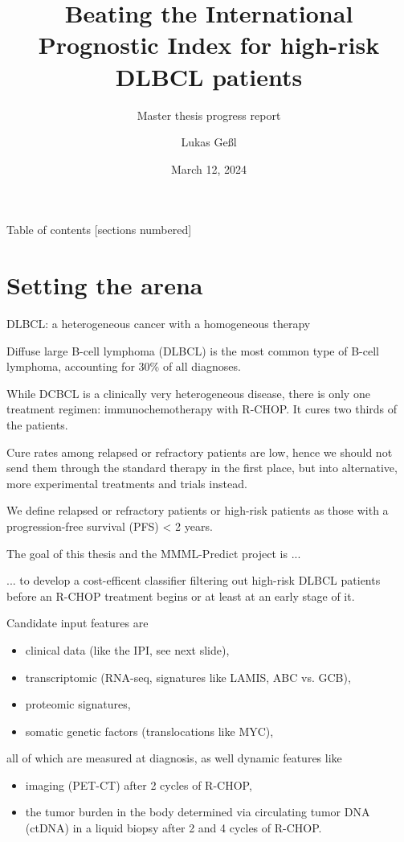 \documentclass[10pt, aspectratio=169]{beamer}
\title{Beating the International Prognostic Index for high-risk DLBCL patients}
\subtitle{Master thesis progress report}
\date{March 12, 2024}
\author{Lukas Geßl}
\institute{Chair of Statistical Bioinformatics, Regensburg University}
\begin{document}
\maketitle

\begin{frame}{Table of contents}
  [sections numbered]
  \tableofcontents[hideallsubsections]
\end{frame}

\section{Setting the arena}

\begin{frame}{DLBCL: a heterogeneous cancer with a homogeneous therapy}

  Diffuse large B-cell lymphoma (DLBCL) is the most common type of B-cell lymphoma, 
  accounting for 30\% of all diagnoses.

  While DCBCL is a clinically very heterogeneous disease, there is only one treatment 
  regimen: immunochemotherapy with R-CHOP. It cures two thirds of the patients.

  Cure rates among relapsed or refractory patients are low, hence we should not send 
  them through the standard therapy in the first place, but into alternative, more 
  experimental treatments and trials instead. 
  
  We define relapsed or refractory patients or \alert{high-risk} patients as those with a 
  \alert{progression-free survival (PFS) < 2 years}.

\end{frame}

\begin{frame}{The goal of this thesis and the MMML-Predict project is ...}

  ... to develop a \alert{cost-efficent classifier filtering out high-risk DLBCL patients} before an R-CHOP 
  treatment begins or at least at an early stage of it. 

  Candidate input features are 

  \begin{itemize}
    \item clinical data (like the IPI, see next slide),
    \item transcriptomic (RNA-seq, signatures like LAMIS, ABC vs. GCB),
    \item proteomic signatures,
    \item somatic genetic factors (translocations like MYC),
  \end{itemize}

  all of which are measured \alert{at diagnosis}, as well \alert{dynamic} features like 

  \begin{itemize}
    \item imaging (PET-CT) after 2 cycles of R-CHOP,
    \item the tumor burden in the body determined via circulating tumor DNA (ctDNA) in a 
    liquid biopsy after 2 and 4 cycles of R-CHOP. 
  \end{itemize}

\end{frame}
\end{document}
